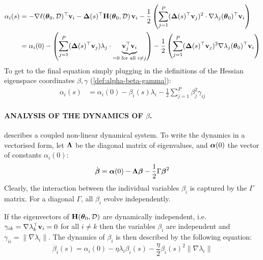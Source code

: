 \documentclass{article} %
\newcommand{\hessian}{\vH}
\begin{document}
{    \begin{align}
        \alpha_i(s) &= -\grad\loss(\vparam_0, \data)^\top\vv_i  -  \vDelta(s)^\top\hessian(\vparam_0, \data)\,\vv_i -\frac{1}{2}\rnd{\sum_{j=1}^P (\vDelta(s)^\top\vv_j)^2 \cdot \grad\lambda_j(\vparam_0)^\top\vv_i} \\
        & = \alpha_i(0) -\rnd{\sum_{j=1}^P (\vDelta(s)^\top\vv_j) \lambda_j \cdot \underbrace{\vv_j^\top \vv_i}_{=0 \text{ for all } i\neq j}} - \frac{1}{2}\rnd{\sum_{j=1}^P (\vDelta(s)^\top\vv_j)^2 \grad\lambda_j(\vparam_0)^\top\vv_i}
    \end{align}
    To get to the final equation simply plugging in the definitions of the Hessian eigenspace coordinates $\beta, \gamma$ (\cref{def:alpha-beta-gamma}):
    \begin{align}
        \alpha_i(s)& = \alpha_i(0) -  \beta_i(s) \lambda_i   - \frac{1}{2}\sum_{j=1}^P \beta_j^2\gamma_{ij}
    \end{align}
}


\newpage

\paragraph{ANALYSIS OF THE DYNAMICS OF $\beta$.}

 describes a coupled non-linear dynamical system. To write the dynamics in a vectorised form, let $\mbox{$\mbox{$\boldsymbol{\Lambda}$}$}$ be the diagonal matrix of eigenvalues, and $\mbox{$\mbox{$\boldsymbol{\alpha}$}$}(0)$ the vector of constants $\alpha_i(0)$: 
\begin{align}
    \label{eq:vector-beta-dynamics}
    \dot{\mbox{$\mbox{$\boldsymbol{\beta}$}$}} = \mbox{$\mbox{$\boldsymbol{\alpha}$}$}(0) -  \mbox{$\mbox{$\boldsymbol{\Lambda}$}$} \mbox{$\mbox{$\boldsymbol{\beta}$}$} - \frac{1}{2} \Gamma \mbox{$\mbox{$\boldsymbol{\beta}$}$}^2
\end{align}
Clearly, the interaction between the individual variables $\beta_i$ is captured by the $\Gamma$ matrix. For a diagonal $\Gamma$, all $\beta_i$ evolve independently. 

\begin{lemma}
    If the eigenvectors of $\hessian(\vparam_0, \data)$ are dynamically independent, i.e. $\gamma_{ik} = \nabla\lambda_k^\top\mbox{$\mbox{$\mathbf{v}$}$}_i = 0$ for all $i\neq k$ then the variables $\beta_i$ are independent and $\gamma_{ii} = \|\nabla\lambda_i\|$. The dynamics of $\beta_i$ is then described by the following equation: 
    \begin{equation}
        \label{eq:indepdynamics}
        \dot\beta_i(s) = \alpha_i(0) -\eta \lambda_i \beta_i(s) - \frac{\eta}{2}\beta_i(s)^2 \|\nabla\lambda_i\|
    \end{equation}
\end{lemma}
\end{document}
